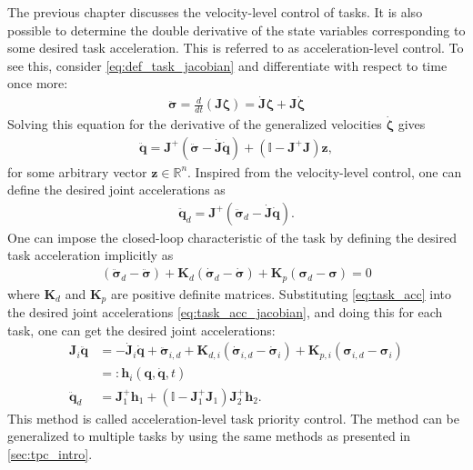 The previous chapter discusses the velocity-level control of tasks. It is also 
possible to determine the double derivative of the state variables corresponding to some
desired task acceleration. This is referred to as acceleration-level control.
To see this, consider \autoref{eq:def_task_jacobian} and differentiate
with respect to time once more:
\begin{align}
    \ddot{\bm{\sigma}} = \frac{d}{dt}\left(\bm{J} \bm{\zeta}\right) = \dot{\bm{J}} \bm{\zeta} + \bm{J} \dot{\bm{\zeta}}
    \label{eq:task_acc_jacobian}
\end{align}
Solving this equation for the derivative of the generalized velocities \(\dot{\bm{\zeta}}\) gives
\begin{align}
    \ddot{\bm{q}} = \bm{J}^{+} \left(\ddot{\bm{\sigma}} - \dot{\bm{J}}\dot{\bm{q}}\right) +
    \left(\mathbb{I} - \bm{J}^{+}\bm{J}\right) \bm{z} \label{eq:task_acc_control},
\end{align}
for some arbitrary vector $\bm{z} \in \mathbb{R}^n$. Inspired from the
velocity-level control, one can define the desired joint accelerations as
\begin{align}
    \ddot{\bm{q}}_d = \bm{J}^{+} \left(\ddot{\bm{\sigma}}_d
    - \dot{\bm{J}}\dot{\bm{q}}\right) \label{eq:task_priority_acc}.
\end{align}
One can impose the closed-loop characteristic of the task by defining the desired
task acceleration implicitly as
\begin{align}
    \left(\ddot{\bm{\sigma}}_d - \ddot{\bm{\sigma}}\right) +
    \bm{K}_d\left(\dot{\bm{\sigma}}_d - \dot{\bm{\sigma}}\right) +
    \bm{K}_p\left(\bm{\sigma}_d - \bm{\sigma}\right) = 0 \label{eq:task_acc}
\end{align}
where $\bm{K}_d$ and $\bm{K}_p$ are positive definite matrices. Substituting
\autoref{eq:task_acc} into the desired joint accelerations \autoref{eq:task_acc_jacobian},
and doing this for each task, one can get the desired joint accelerations:
\begin{subequations}
\begin{align}
    \bm{J}_i\ddot{\bm{q}} &= -\dot{\bm{J}}_i\dot{\bm{q}} + \ddot{\bm{\sigma}}_{i,d} 
    + \bm{K}_{d,i}\left(\dot{\bm{\sigma}}_{i,d} - \dot{\bm{\sigma}}_i\right)
    + \bm{K}_{p,i}\left(\bm{\sigma}_{i,d} - \bm{\sigma}_i\right) \\
    &=: \bm{h}_i(\bm{q}, \dot{\bm{q}}, t) \\
    \ddot{\bm{q}}_d &= \bm{J}_1^{+} \bm{h}_1 + \left(\mathbb{I} - \bm{J}_1^+\bm{J}_1\right) \bm{J}_2^{+} \bm{h}_2.
\end{align}
\end{subequations}
This method is called acceleration-level task priority control. The method can
be generalized to multiple tasks by using the same methods as presented in \autoref{sec:tpc_intro}.


